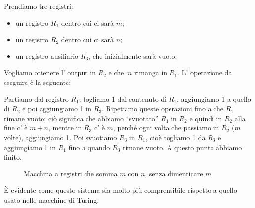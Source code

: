 \begin{esempio}
    Prendiamo tre registri:
    \begin{itemize}
    \item un registro \( R_1 \) dentro cui ci sar\`a \( m \);
    \item un registro \( R_2 \) dentro cui ci sar\`a \( n \);
    \item un registro ausiliario \( R_3 \), che inizialmente sar\`a vuoto;
    \end{itemize}
    Vogliamo ottenere l' output in \( R_2 \) e che \( m \) rimanga in
    \( R_1 \). L' operazione da eseguire \`e la seguente:

    Partiamo dal registro \( R_1 \): togliamo 1 dal contenuto di \(
R_1 \), aggiungiamo 1 a quello di \( R_2 \) e poi aggiungiamo 1 in
    \( R_3 \). Ripetiamo queste operazioni fino a che \( R_1 \) rimane
    vuoto; ci\`o significa che abbiamo ``svuotato'' \( R_1 \) in \(
R_2 \) e quindi in \( R_2 \) alla fine c' \`e \( m+n \), mentre in
    \( R_3 \) c' \`e \( m \), perch\'e ogni volta che passiamo in \(
R_2 \) (\( m \) volte), aggiungiamo 1. Poi svuotiamo \( R_3 \) in
    \( R_1 \), cio\`e togliamo 1 da \( R_3 \) e aggiungiamo 1 in \(
R_1 \) fino a quando \( R_3 \) rimane vuoto. A questo punto
    abbiamo finito.

    \begin{figure}[hbtp]
    \hspace{0cm}
    \caption{Macchina a registri che somma \( m \) con \( n \), senza dimenticare \( m \)}
    \end{figure}

\end{esempio}

\`E evidente come questo sistema sia molto pi\`u comprensibile rispetto a quello usato nelle macchine di Turing.

